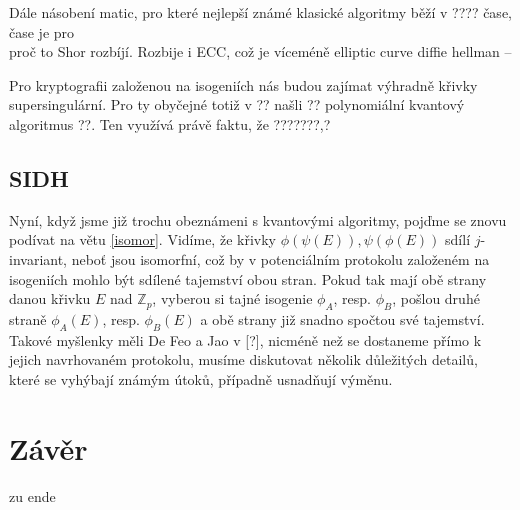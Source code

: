 \documentclass [12pt]{report}
\begin{document}
Dále násobení matic, pro které nejlepší známé klasické algoritmy běží v ???? čase, čase je pro\\







proč to Shor rozbíjí. Rozbije i ECC, což je víceméně elliptic curve diffie hellman
--

Pro kryptografii založenou na isogeniích nás budou zajímat výhradně křivky supersingulární. Pro ty obyčejné totiž v ?? našli ?? polynomiální kvantový algoritmus ??. Ten využívá právě faktu, že ???????,?

\section{SIDH}

Nyní, když jsme již trochu obeznámeni s kvantovými algoritmy, pojďme se znovu podívat na větu \eqref{isomor}.  Vidíme, že křivky $\phi (\psi (E)), \psi (\phi (E))$ sdílí $j$-invariant, neboť jsou isomorfní, což by v potenciálním protokolu založeném na isogeniích mohlo být sdílené tajemství obou stran. Pokud tak mají obě strany danou křivku $E$ nad $\mathbb{Z}_p$, vyberou si tajné isogenie $\phi_A$, resp. $\phi_B$, pošlou druhé straně $\phi_A(E)$, resp. $\phi_B(E)$ a obě strany již snadno spočtou své tajemství. Takové myšlenky měli De Feo a Jao v [?], nicméně než se dostaneme přímo k jejich navrhovaném protokolu, musíme diskutovat několik důležitých detailů, které se vyhýbají známým útoků, případně usnadňují výměnu.

\chapter*{Závěr}
zu ende


\end{document}
